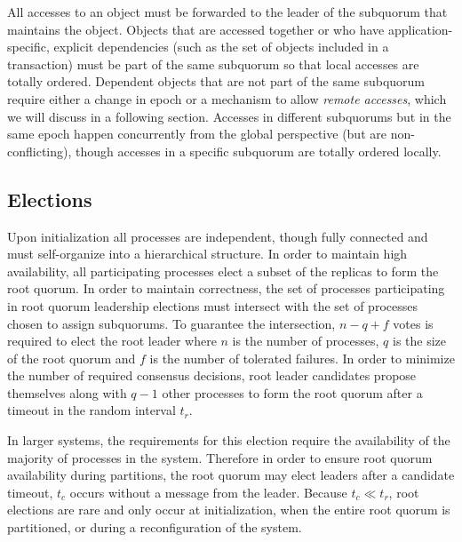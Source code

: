 \documentclass[sigconf]{acmart}
\begin{document}
All accesses to an object must be forwarded to the leader of the subquorum that maintains
the object.
Objects that are accessed together or who have application-specific, explicit
dependencies (such as the set of objects included in a transaction) must be part of the
same subquorum so that local accesses are totally ordered.
Dependent objects that are not part of the same subquorum require either a change in
epoch or a mechanism to allow \emph{remote accesses}, which we will discuss in a
following section.
Accesses in different subquorums but in the same epoch happen concurrently
from the global perspective (but are non-conflicting), though accesses in a
specific subquorum are totally ordered locally.

\subsection{Elections}

Upon initialization all processes are independent, though fully connected and must
self-organize into a hierarchical structure.
In order to maintain high availability, all participating processes elect a subset of the
replicas to form the root quorum.
In order to maintain correctness, the set of processes participating in root quorum
leadership elections must intersect with the set of processes chosen to assign
subquorums.
To guarantee the intersection, $n - q + f$ votes is required to elect the root leader
where $n$ is the number of processes, $q$ is the size of the root quorum and $f$ is the
number of tolerated failures.
In order to minimize the number of required consensus decisions, root leader candidates
propose themselves along with $q-1$ other processes to form the root quorum after a
timeout in the random interval $t_r$.

In larger systems, the requirements for this election require the availability of the
majority of processes in the system.
Therefore in order to ensure root quorum availability during partitions, the root quorum
may elect leaders after a candidate timeout, $t_c$ occurs without a message from the
leader.
Because $t_c \ll t_r$, root elections are rare and only occur at initialization, when the
entire root quorum is partitioned, or during a reconfiguration of the system.
\end{document}

